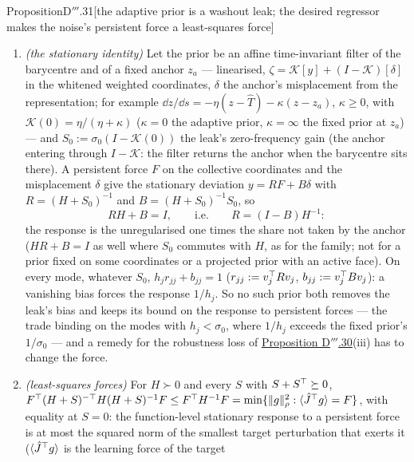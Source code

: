 \begin{thm}{Proposition}{D$'''$.31}[the adaptive prior is a washout leak; the desired regressor makes the noise's
persistent force a least-squares force]
\begin{enumerate}[label=\textup{(\roman*)}]
    $h_j + \sigma_0i\omega/(i\omega + \eta)$: the fixed prior's $h_j + \sigma_0$ for $\omega\gg\eta$, the bare $h_j$ at
    $\omega = 0$. This is \hyperref[res:thmDppp:23]{Theorem D$'''$.23}(iii)'s bias removal --- feedback through a
    washout filter leaves the equilibria where they are (\cite{S54}), here the replicated ones --- and its price: no
    leak opposes a persistent force on the class barycentres (the separations keep the full leak).
  \item \emph{(the stationary identity)} Let the prior be an affine time-invariant filter of the barycentre and of a
    fixed anchor $z_a$ --- linearised, $\zeta = \mathcal{K}[y] + (I - \mathcal{K})[\delta]$ in the whitened weighted
    coordinates, $\delta$ the anchor's misplacement from the representation; for example
    $\dd z/\dd s = -\eta(z - \hat T) - \kappa(z - z_a)$, $\kappa\ge0$, with $\mathcal{K}(0) = \eta/(\eta + \kappa)$
    ($\kappa = 0$ the adaptive prior, $\kappa = \infty$ the fixed prior at $z_a$) --- and
    $S_0 := \sigma_0(I - \mathcal{K}(0))$ the leak's zero-frequency gain (the anchor entering through
    $I - \mathcal{K}$: the filter returns the anchor when the barycentre sits there). A persistent force $F$ on the
    collective coordinates and the misplacement $\delta$ give the stationary deviation $y = RF + B\delta$ with
    $R = (H + S_0)^{-1}$ and $B = (H + S_0)^{-1}S_0$, so
    \[
      RH + B = I,\qquad\text{i.e.}\qquad R = (I - B)H^{-1}:
    \]
    the response is the unregularised one times the share not taken by the anchor ($HR + B = I$ as well where $S_0$
    commutes with $H$, as for the family; not for a prior fixed on some coordinates or a projected prior with an
    active face). On every mode, whatever $S_0$, $h_jr_{jj} + b_{jj} = 1$ ($r_{jj} := v_j^\top Rv_j$,
    $b_{jj} := v_j^\top Bv_j$): a vanishing bias forces the response $1/h_j$. So no such prior both removes the leak's
    bias and keeps its bound on the response to persistent forces --- the trade binding on the modes with
    $h_j < \sigma_0$, where $1/h_j$ exceeds the fixed prior's $1/\sigma_0$ --- and a remedy for the robustness loss of
    \hyperref[res:thmDppp:30]{Proposition D$'''$.30}(iii) has to change the force.
  \item \emph{(least-squares forces)} For $H\succ0$ and every $S$ with $S + S^\top\succeq0$,
    $F^\top(H + S)^{-\top}H(H + S)^{-1}F\le F^\top H^{-1}F = \min\{\lVert g\rVert^2_\rho : \langle\hat J^\top g\rangle = F\}$, with
    equality at $S = 0$: the function-level stationary response to a persistent force is at most the squared norm of
    the smallest target perturbation that exerts it ($\langle\hat J^\top g\rangle$ is the learning force of the target

\end{enumerate}
\end{thm}

